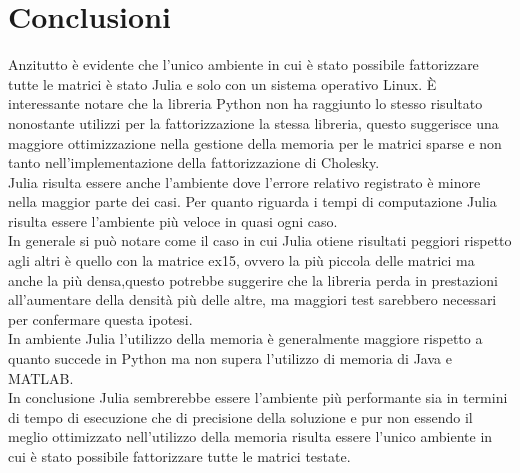 \documentclass{report}
\begin{document}
        \section{Conclusioni}
            Anzitutto è evidente che l'unico ambiente in cui è stato possibile fattorizzare tutte le matrici è stato
            Julia e solo con un sistema operativo Linux. \`E interessante notare che la libreria Python non ha raggiunto
            lo stesso risultato nonostante utilizzi per la fattorizzazione la stessa libreria, questo suggerisce una
            maggiore ottimizzazione nella gestione della memoria per le matrici sparse e non tanto nell'implementazione 
            della fattorizzazione di Cholesky.\\
            Julia risulta essere anche l'ambiente dove l'errore relativo registrato è minore nella maggior parte 
            dei casi.
            Per quanto riguarda i tempi di computazione Julia risulta essere l'ambiente più veloce in quasi ogni caso.\\
            In generale si può notare come il caso in cui Julia otiene risultati peggiori rispetto agli altri è quello 
            con la matrice ex15, ovvero la più piccola delle matrici ma anche la più densa,questo potrebbe suggerire 
            che la libreria perda in prestazioni all'aumentare della densità più delle altre, ma maggiori test sarebbero
            necessari per confermare questa ipotesi.\\
            In ambiente Julia l'utilizzo della memoria è generalmente maggiore rispetto a quanto succede in Python ma 
            non supera l'utilizzo di memoria di Java e MATLAB.\\
            In conclusione Julia sembrerebbe essere l'ambiente più performante sia in termini di tempo di esecuzione che
            di precisione della soluzione e pur non essendo il meglio ottimizzato nell'utilizzo della memoria risulta
            essere l'unico ambiente in cui è stato possibile fattorizzare tutte le matrici testate.

            
                
\end{document}
